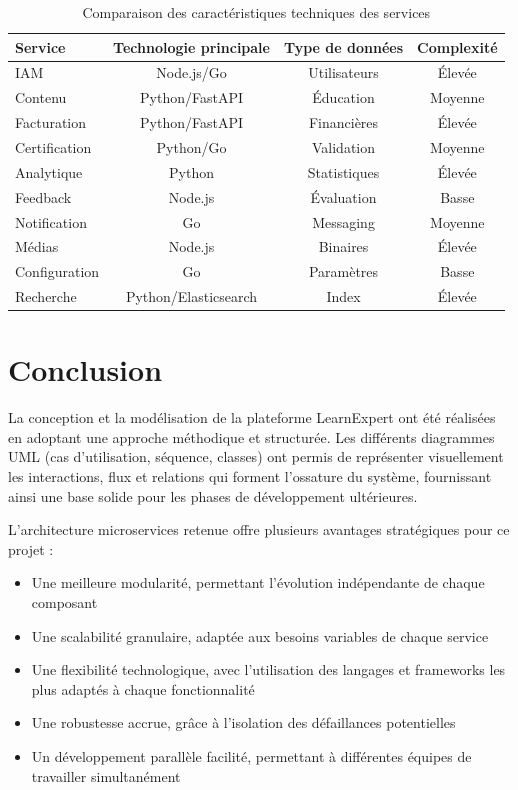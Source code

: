 \begin{table}[h!]
\centering
\small
\caption{Comparaison des caractéristiques techniques des services}
\label{tab:comparaison_services}
\begin{tabular}{|l|c|c|c|}
\hline
\textbf{Service} & \textbf{Technologie principale} & \textbf{Type de données} & \textbf{Complexité} \\
\hline
IAM & Node.js/Go & Utilisateurs & Élevée \\
Contenu & Python/FastAPI & Éducation & Moyenne \\
Facturation & Python/FastAPI & Financières & Élevée \\
Certification & Python/Go & Validation & Moyenne \\
Analytique & Python & Statistiques & Élevée \\
Feedback & Node.js & Évaluation & Basse \\
Notification & Go & Messaging & Moyenne \\
Médias & Node.js & Binaires & Élevée \\
Configuration & Go & Paramètres & Basse \\
Recherche & Python/Elasticsearch & Index & Élevée \\
\hline
\end{tabular}
\end{table}
\normalsize 

\section{Conclusion}

La conception et la modélisation de la plateforme LearnExpert ont été réalisées en adoptant une approche méthodique et structurée. Les différents diagrammes UML (cas d'utilisation, séquence, classes) ont permis de représenter visuellement les interactions, flux et relations qui forment l'ossature du système, fournissant ainsi une base solide pour les phases de développement ultérieures.

L'architecture microservices retenue offre plusieurs avantages stratégiques pour ce projet :
\begin{itemize}
  \item Une meilleure modularité, permettant l'évolution indépendante de chaque composant
  \item Une scalabilité granulaire, adaptée aux besoins variables de chaque service
  \item Une flexibilité technologique, avec l'utilisation des langages et frameworks les plus adaptés à chaque fonctionnalité
  \item Une robustesse accrue, grâce à l'isolation des défaillances potentielles
  \item Un développement parallèle facilité, permettant à différentes équipes de travailler simultanément
\end{itemize}

